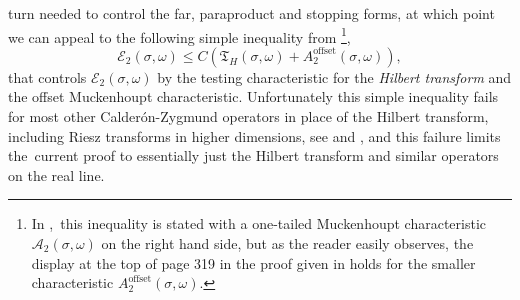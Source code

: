 \documentclass{amsart}%
\theoremstyle{plain}
\numberwithin{equation}{section}
\begin{document}
\begin{description}
turn needed to control the far, paraproduct and stopping forms, at which point
we can appeal to the following simple inequality from \cite{LaSaUr2}%
\footnote{In \cite{LaSaUr2},\ this inequality is stated with a one-tailed
Muckenhoupt characteristic $\mathcal{A}_{2}\left(  \sigma,\omega\right)  $ on
the right hand side, but as the reader easily observes, the display at the top
of page 319 in the proof given in \cite{LaSaUr2} holds for the smaller
characteristic $A_{2}^{\operatorname*{offset}}\left(  \sigma,\omega\right)
$.},%
\begin{equation}
\mathcal{E}_{2}\left(  \sigma,\omega\right)  \leq C\left(  \mathfrak{T}%
_{H}\left(  \sigma,\omega\right)  +A_{2}^{\operatorname*{offset}}\left(
\sigma,\omega\right)  \right)  ,\label{energy control}%
\end{equation}
that controls $\mathcal{E}_{2}\left(  \sigma,\omega\right)  $ by the testing
characteristic for the \emph{Hilbert transform} and the offset Muckenhoupt
characteristic. Unfortunately this simple inequality fails for most other
Calder\'{o}n-Zygmund operators in place of the Hilbert transform, including
Riesz transforms in higher dimensions, see \cite{Saw} and \cite{SaShUr11}, and
this failure limits the\ current proof to essentially just the Hilbert
transform and similar operators on the real line.
\end{description}
\end{document}
